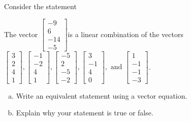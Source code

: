 
\begin{exerciseStatement}


Consider the statement 
\begin{center}\begin{minipage}{0.8\textwidth}
 The vector \( \left[\begin{array}{c}
-9 \\
6 \\
-14 \\
-5
\end{array}\right] \)is a linear combination of the vectors \( \left[\begin{array}{c}
3 \\
2 \\
4 \\
1
\end{array}\right] , \left[\begin{array}{c}
-1 \\
-2 \\
4 \\
1
\end{array}\right] , \left[\begin{array}{c}
-5 \\
2 \\
-5 \\
-2
\end{array}\right] , \left[\begin{array}{c}
3 \\
-1 \\
4 \\
0
\end{array}\right] , \text{ and } \left[\begin{array}{c}
1 \\
-1 \\
-1 \\
-3
\end{array}\right] \). 
\end{minipage}\end{center}
    


\begin{enumerate}[(a)]
\item  Write an equivalent statement using a vector equation.
\item  Explain why your statement is true or false.
\end{enumerate}
    
\end{exerciseStatement}
    
